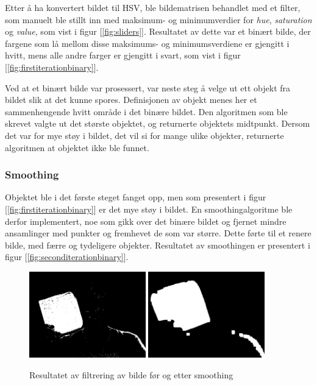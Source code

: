 Etter å ha konvertert bildet til HSV, ble bildematrisen behandlet med et filter, som manuelt ble stillt inn med maksimum- og minimumverdier for \emph{hue}, \emph{saturation} og \emph{value}, som vist i figur [\ref{fig:sliders}]. Resultatet av dette var et binært bilde, der fargene som lå mellom disse maksimums- og minimumsverdiene er gjengitt i hvitt, mens alle andre farger er gjengitt i svart, som vist i figur [\ref{fig:firstiterationbinary}].

Ved at et binært bilde var prosessert, var neste steg å velge ut ett objekt fra bildet slik at det kunne spores. Definisjonen av objekt menes her et sammenhengende hvitt område i det binære bildet. Den algoritmen som ble skrevet valgte ut det største objektet, og returnerte objektets midtpunkt. Dersom det var for mye støy i bildet, det vil si for mange ulike objekter, returnerte algoritmen at objektet ikke ble funnet.

\subsubsection{Smoothing}

Objektet ble i det første steget fanget opp, men som presentert i figur [\ref{fig:firstiterationbinary}] er det mye støy i bildet. En smoothingalgoritme ble derfor implementert, noe som gikk over det binære bildet og fjernet mindre ansamlinger med punkter og fremhevet de som var større. Dette førte til et renere bilde, med færre og tydeligere objekter. Resultatet av smoothingen er presentert i figur [\ref{fig:seconditerationbinary}].

\begin{figure}[!ht]
	\centering
	{\includegraphics[width=0.45\textwidth]{img/first-binary.jpg}}
	{\includegraphics[width=0.45\textwidth]{img/second-binary.jpg}}
	\caption{Resultatet av filtrering av bilde før og etter smoothing}
\end{figure}

